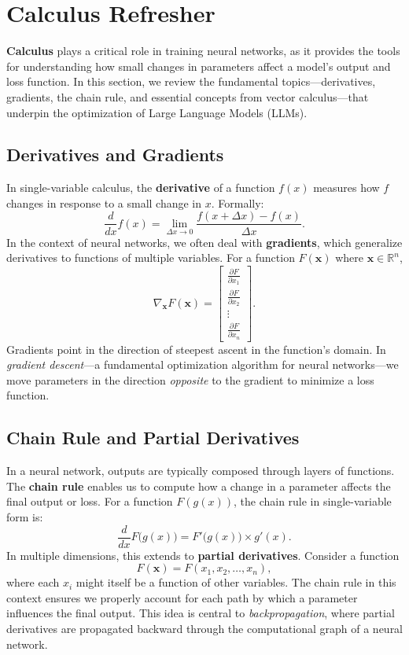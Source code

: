 \section{Calculus Refresher}
\label{sec:calculus_refresher}

\noindent
\textbf{Calculus} plays a critical role in training neural networks, as it provides the tools for understanding how small changes in parameters affect a model’s output and loss function. In this section, we review the fundamental topics—derivatives, gradients, the chain rule, and essential concepts from vector calculus—that underpin the optimization of Large Language Models (LLMs).

\subsection{Derivatives and Gradients}
\noindent
In single-variable calculus, the \textbf{derivative} of a function $f(x)$ measures how $f$ changes in response to a small change in $x$. Formally:
\[
\frac{d}{dx} f(x) = \lim_{\Delta x \to 0} \frac{f(x + \Delta x) - f(x)}{\Delta x}.
\]
In the context of neural networks, we often deal with \textbf{gradients}, which generalize derivatives to functions of multiple variables. For a function $F(\mathbf{x})$ where $\mathbf{x} \in \mathbb{R}^n$,
\[
\nabla_\mathbf{x} F(\mathbf{x}) = 
\begin{bmatrix}
\frac{\partial F}{\partial x_1} \\
\frac{\partial F}{\partial x_2} \\
\vdots \\
\frac{\partial F}{\partial x_n}
\end{bmatrix}.
\]
Gradients point in the direction of steepest ascent in the function’s domain. In \emph{gradient descent}—a fundamental optimization algorithm for neural networks—we move parameters in the direction \emph{opposite} to the gradient to minimize a loss function.

\subsection{Chain Rule and Partial Derivatives}
\noindent
In a neural network, outputs are typically composed through layers of functions. The \textbf{chain rule} enables us to compute how a change in a parameter affects the final output or loss. For a function $F(g(x))$, the chain rule in single-variable form is:
\[
\frac{d}{dx} F\bigl(g(x)\bigr)
= F'\bigl(g(x)\bigr) \times g'(x).
\]
In multiple dimensions, this extends to \textbf{partial derivatives}. Consider a function
\[
F(\mathbf{x}) = F(x_1, x_2, \ldots, x_n),
\]
where each $x_i$ might itself be a function of other variables. The chain rule in this context ensures we properly account for each path by which a parameter influences the final output. This idea is central to \emph{backpropagation}, where partial derivatives are propagated backward through the computational graph of a neural network.

